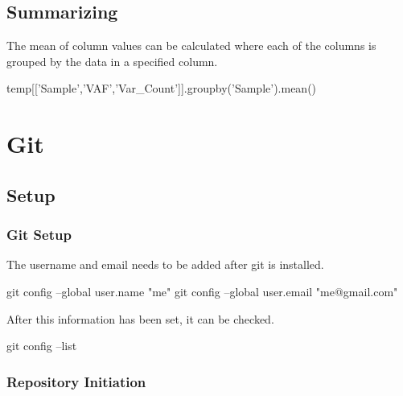 \documentclass[]{book}
\newenvironment{Shaded}{\begin{snugshade}}{\end{snugshade}}
\newcommand{\StringTok}[1]{\textcolor[rgb]{0.31,0.60,0.02}{#1}}
\newcommand{\FunctionTok}[1]{\textcolor[rgb]{0.00,0.00,0.00}{#1}}
\newcommand{\NormalTok}[1]{#1}
\begin{document}
\section{Summarizing}\label{summarizing}

The mean of column values can be calculated where each of the columns is
grouped by the data in a specified column.

\begin{Shaded}
\begin{Highlighting}[]
\NormalTok{temp[[}\StringTok{'Sample'}\NormalTok{,}\StringTok{'VAF'}\NormalTok{,}\StringTok{'Var_Count'}\NormalTok{]].groupby(}\StringTok{'Sample'}\NormalTok{).mean()}
\end{Highlighting}
\end{Shaded}

\chapter{Git}\label{git}

\section{Setup}\label{setup}

\subsection{Git Setup}\label{git-setup}

The username and email needs to be added after git is installed.

\begin{Shaded}
\begin{Highlighting}[]
\FunctionTok{git}\NormalTok{ config --global user.name }\StringTok{"me"}
\FunctionTok{git}\NormalTok{ config --global user.email }\StringTok{"me@gmail.com"}
\end{Highlighting}
\end{Shaded}

After this information has been set, it can be checked.

\begin{Shaded}
\begin{Highlighting}[]
\FunctionTok{git}\NormalTok{ config --list}
\end{Highlighting}
\end{Shaded}

\subsection{Repository Initiation}\label{repository-initiation}
\end{document}
